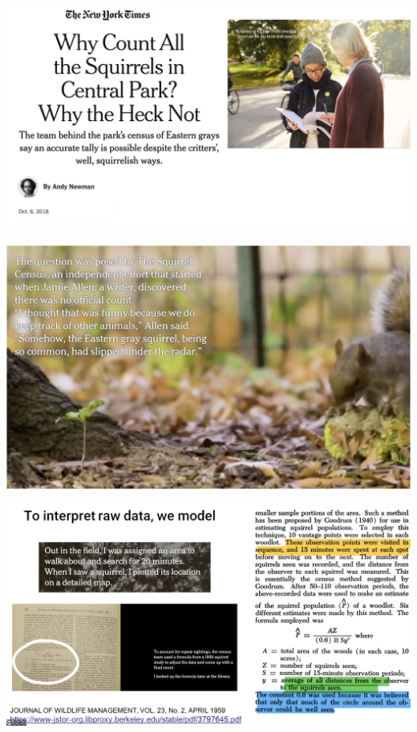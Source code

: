 \documentclass[aspectratio=169]{../latex_main/tntbeamer}  %
\begin{document}
	
	\begin{frame}
	    \includegraphics[scale=.6]{Bild3}
	\end{frame}
	
	\begin{frame}
	    \includegraphics[scale=.6]{Bild4}
	\end{frame}
	
	
	\begin{frame}
	    \includegraphics[scale=.37]{Bild5}
	\end{frame}
	
\end{document}
